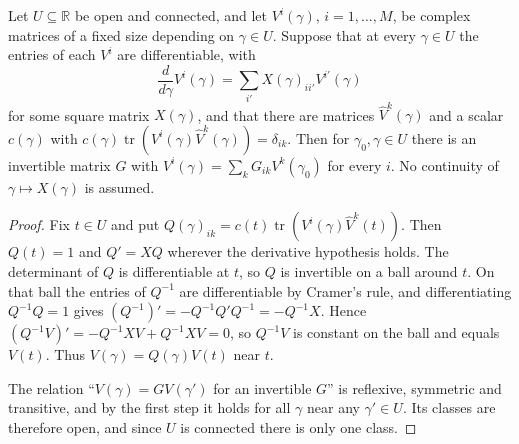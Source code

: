 \begin{lemma}
    \label{lem:glm_l_path_frame}
    \leanok
    Let $U\subseteq\mathbb R$ be open and connected, and let $V^i(\gamma)$,
    $i=1,\ldots,M$, be complex matrices of a fixed size depending on
    $\gamma\in U$. Suppose that at every $\gamma\in U$ the entries of each
    $V^i$ are differentiable, with
    \[
        \frac{d}{d\gamma}V^i(\gamma)=\sum_{i'}X(\gamma)_{ii'}V^{i'}(\gamma)
    \]
    for some square matrix $X(\gamma)$, and that there are matrices
    $\widehat V^k(\gamma)$ and a scalar $c(\gamma)$ with
    $c(\gamma)\operatorname{tr}(V^i(\gamma)\widehat V^k(\gamma))=\delta_{ik}$.
    Then for $\gamma_0,\gamma\in U$ there is an invertible matrix $G$ with
    $V^i(\gamma)=\sum_kG_{ik}V^k(\gamma_0)$ for every $i$. No continuity of
    $\gamma\mapsto X(\gamma)$ is assumed.
\end{lemma}
\begin{proof}
    \leanok
    Fix $t\in U$ and put
    $Q(\gamma)_{ik}=c(t)\operatorname{tr}(V^i(\gamma)\widehat V^k(t))$. Then
    $Q(t)=1$ and $Q'=XQ$ wherever the derivative hypothesis holds. The
    determinant of $Q$ is differentiable at $t$, so $Q$ is invertible on a
    ball around $t$. On that ball the entries of $Q^{-1}$ are differentiable
    by Cramer's rule, and differentiating $Q^{-1}Q=1$ gives
    $(Q^{-1})'=-Q^{-1}Q'Q^{-1}=-Q^{-1}X$. Hence
    $(Q^{-1}V)'=-Q^{-1}XV+Q^{-1}XV=0$, so $Q^{-1}V$ is constant on the ball
    and equals $V(t)$. Thus $V(\gamma)=Q(\gamma)V(t)$ near $t$.

    The relation ``$V(\gamma)=GV(\gamma')$ for an invertible $G$'' is
    reflexive, symmetric and transitive, and by the first step it holds for
    all $\gamma$ near any $\gamma'\in U$. Its classes are therefore open, and
    since $U$ is connected there is only one class.
\end{proof}

